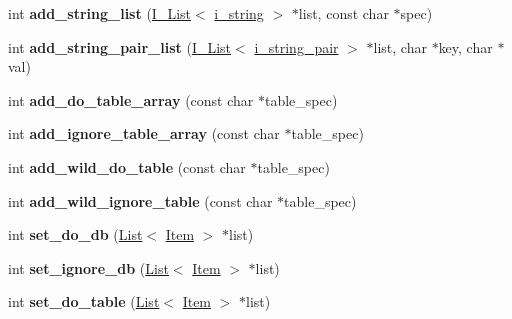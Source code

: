 \begin{DoxyCompactItemize}
\mbox{\label{classRpl__filter_a0bd1dc10c4c14a8cdf033add2382ae75}} 
int {\bfseries add\+\_\+string\+\_\+list} (\mbox{\hyperlink{classI__List}{I\+\_\+\+List}}$<$ \mbox{\hyperlink{classi__string}{i\+\_\+string}} $>$ $\ast$list, const char $\ast$spec)
\item 
\mbox{\label{classRpl__filter_a8df7b8e188bfe554e83b53aa6b79b2f5}} 
int {\bfseries add\+\_\+string\+\_\+pair\+\_\+list} (\mbox{\hyperlink{classI__List}{I\+\_\+\+List}}$<$ \mbox{\hyperlink{classi__string__pair}{i\+\_\+string\+\_\+pair}} $>$ $\ast$list, char $\ast$key, char $\ast$val)
\item 
\mbox{\label{classRpl__filter_a80ee77c51f2c595636feecf51c674cd5}} 
int {\bfseries add\+\_\+do\+\_\+table\+\_\+array} (const char $\ast$table\+\_\+spec)
\item 
\mbox{\label{classRpl__filter_a775a17516f099d48156c0faf0c65027b}} 
int {\bfseries add\+\_\+ignore\+\_\+table\+\_\+array} (const char $\ast$table\+\_\+spec)
\item 
\mbox{\label{classRpl__filter_abb8512aad6d4d10414dfd121747457eb}} 
int {\bfseries add\+\_\+wild\+\_\+do\+\_\+table} (const char $\ast$table\+\_\+spec)
\item 
\mbox{\label{classRpl__filter_aeb320153e580eb0a60196d424815c590}} 
int {\bfseries add\+\_\+wild\+\_\+ignore\+\_\+table} (const char $\ast$table\+\_\+spec)
\item 
\mbox{\label{classRpl__filter_aabb9d6af1e3d095c44608263ab5db3eb}} 
int {\bfseries set\+\_\+do\+\_\+db} (\mbox{\hyperlink{classList}{List}}$<$ \mbox{\hyperlink{classItem}{Item}} $>$ $\ast$list)
\item 
\mbox{\label{classRpl__filter_a880d3c42b32af7b6fc8f7ffd18fb7b22}} 
int {\bfseries set\+\_\+ignore\+\_\+db} (\mbox{\hyperlink{classList}{List}}$<$ \mbox{\hyperlink{classItem}{Item}} $>$ $\ast$list)
\item 
\mbox{\label{classRpl__filter_a48c043acc2eaf3f7cb97a7e8090c42f8}} 
int {\bfseries set\+\_\+do\+\_\+table} (\mbox{\hyperlink{classList}{List}}$<$ \mbox{\hyperlink{classItem}{Item}} $>$ $\ast$list)

\end{DoxyCompactItemize}
